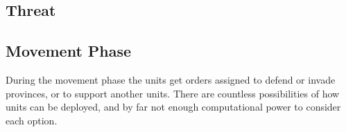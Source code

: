 \documentclass[a4paper]{article} %
\begin{document}
\subsection{Threat}

\subsection{Movement Phase} 

During the movement phase the units get orders assigned to defend or invade provinces, or to support another units. There are countless possibilities of how units can be deployed, and by far not enough computational power to consider each option.   







{}
\end{document}
